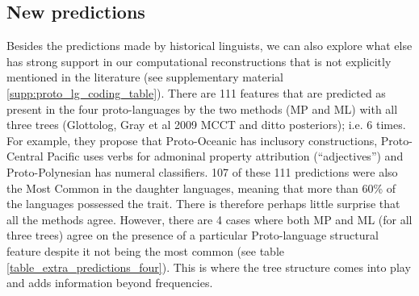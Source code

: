 \documentclass[12pt,letterpaper]{article}
\begin{document}
%
%
\FloatBarrier
\subsection{New predictions}
Besides the predictions made by historical linguists, we can also explore what else has strong support in our computational reconstructions that is not explicitly mentioned in the literature (see supplementary material \ref{supp:proto_lg_coding_table}). There are 111 features that are predicted as present in the four proto-languages by the two methods (MP and ML) with all three trees (Glottolog, Gray et al 2009 MCCT and ditto posteriors); i.e. 6 times. For example, they propose that Proto-Oceanic has inclusory constructions, Proto-Central Pacific uses verbs for admoninal property attribution (``adjectives'') and Proto-Polynesian has numeral classifiers. 107 of these 111 predictions were also the Most Common in the daughter languages, meaning that more than 60\% of the languages possessed the trait. There is therefore perhaps little surprise that all the methods agree. However, there are 4 cases where both MP and ML (for all three trees) agree on the presence of a particular Proto-language structural feature despite it not being the most common (see table \ref{table_extra_predictions_four}). This is where the tree structure comes into play and adds information beyond frequencies.
\end{document}
